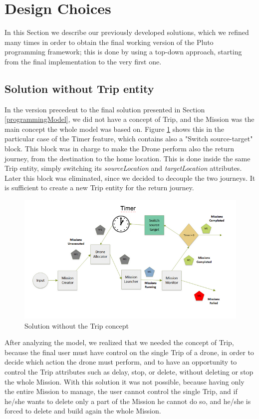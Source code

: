 \section{Design Choices}\label{history}

In this Section we describe our previously developed solutions, which we refined many times in order to obtain the final working version of the Pluto programming framework; this is done by using a top-down approach, starting from the final implementation to the very first one.

\subsection{Solution without Trip entity}

In the version precedent to the final solution presented in Section \ref{programmingModel}, we did not have a concept of Trip, and the Mission was the main concept the whole model was based on. 
Figure \ref{fig:noTrip} shows this in the particular case of the Timer feature, which contains also a "Switch source-target" block. 
This block was in charge to make the Drone perform also the return journey, from the destination to the home location.
This is done inside the same Trip entity, simply switching its \textit{sourceLocation} and \textit{targetLocation} attributes.
Later this block was eliminated, since we decided to decouple the two journeys.
It is sufficient to create a new Trip entity for the return journey.

\begin{figure}[H]
  \centering
  \includegraphics[width=\linewidth]{pictures/NoTrip.png}
  \caption{Solution without the Trip concept}
  \label{fig:noTrip}
\end{figure}

After analyzing the model, we realized that we needed the concept of Trip, because the final user must have control on the single Trip of a drone, in order to decide which action the drone must perform, and to have an opportunity to control the Trip attributes such as delay, stop, or delete, without deleting or stop the whole Mission. 
With this solution it was not possible, because having only the entire Mission to manage, the user cannot control the single Trip, and if he/she wants to delete only a part of the Mission he cannot do so, and he/she is forced to delete and build again the whole Mission.

